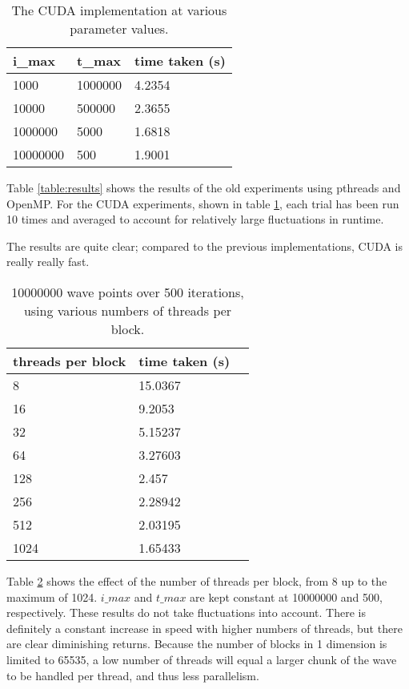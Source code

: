 \documentclass[a4paper]{article}
\begin{document}
\begin{table}[htbp]
    \centering
    \begin{tabular}{l|l|l}
        \hline
        i\_max & t\_max & time taken (s) \\
        \hline
        1000     & 1000000 & 4.2354 \\
        10000    & 500000  & 2.3655 \\
        1000000  & 5000    & 1.6818 \\
        10000000 & 500     & 1.9001 \\
        \hline
    \end{tabular}
    \caption{The CUDA implementation at various parameter values.}
    \label{table:cuda}
\end{table}

Table \ref{table:results} shows the results of the old experiments using
pthreads and OpenMP.
For the CUDA experiments, shown in table \ref{table:cuda}, each trial has been
run 10 times and averaged to account for relatively large fluctuations in
runtime.

The results are quite clear; compared to the previous implementations, CUDA is
really really fast.

\begin{table}[htbp]
    \centering
    \begin{tabular}{l|l|l}
        \hline
        threads per block & time taken (s) \\
        \hline
        8    & 15.0367 \\
        16   & 9.2053 \\
        32   & 5.15237 \\
        64   & 3.27603 \\
        128  & 2.457 \\
        256  & 2.28942 \\
        512  & 2.03195 \\
        1024 & 1.65433 \\
        \hline
    \end{tabular}
    \caption{10000000 wave points over 500 iterations, using various numbers of
    threads per block.}
    \label{table:threads}
\end{table}

Table \ref{table:threads} shows the effect of the number of threads per block,
from 8 up to the maximum of 1024. $i\_max$ and $t\_max$ are kept constant at
10000000 and 500, respectively. These results do not take fluctuations into
account. There is definitely a constant increase in speed with higher numbers of
threads, but there are clear diminishing returns. Because the number of blocks
in 1 dimension is limited to 65535, a low number of threads will equal a larger
chunk of the wave to be handled per thread, and thus less parallelism.
\end{document}
